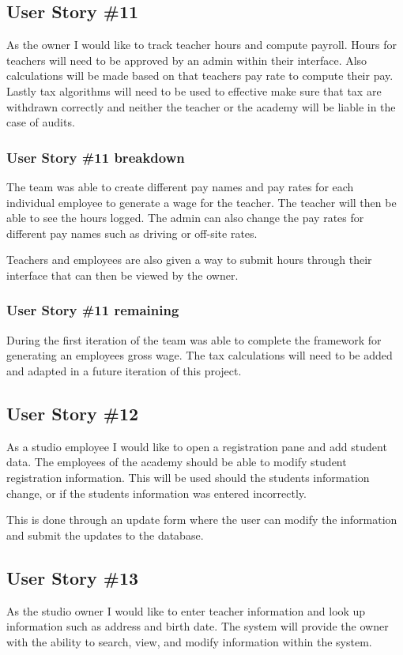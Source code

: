 \subsection{User Story \#11}
As the owner I would like to track teacher hours and compute payroll. Hours for teachers will need to be approved by an admin within their interface. Also calculations will be made based on that teachers pay rate to compute their pay. Lastly tax algorithms will need to be used to effective make sure that tax are withdrawn correctly and neither the teacher or the academy will be liable in the case of audits.

\subsubsection{User Story \#11 breakdown}
The team was able to create different pay names and pay rates for each individual employee to generate a wage for the teacher. The teacher will then be able to see the hours logged. The admin can also change the pay rates for different pay names such as driving or off-site rates.

Teachers and employees are also given a way to submit hours through their interface that can then be viewed by the owner.


\subsubsection{User Story \#11 remaining}
During the first iteration of the team was able to complete the framework for generating an employees gross wage. The tax calculations will need to be added and adapted in a future iteration of this project.


\subsection{User Story \#12}
As a studio employee I would like to open a registration pane and add student data. The employees of the academy should be able to modify student registration information. This will be used should the students information change, or if the students information was entered incorrectly. 

This is done through an update form where the user can modify the information and submit the updates to the database.

\subsection{User Story \#13}
As the studio owner I would like to enter teacher information and look up information such as address and birth date. The system will provide the owner with the ability to search, view, and modify information within the system.

